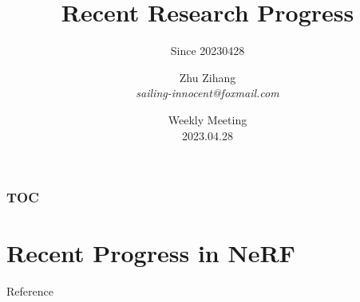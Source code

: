 \documentclass[10pt, hyperref={colorlinks=true,linkcolor=blue},xcolor=dvipsnames]{beamer}
\title[title]{ Recent Research Progress }
\subtitle{Since 20230428}
\author[Zhu Zihang]{\texorpdfstring{Zhu Zihang \\ \smallskip \textit{sailing-innocent@foxmail.com}}{}}
\date[\today]{\texorpdfstring{Weekly Meeting \\ 2023.04.28}{}}
\begin{document}
\begin{frame}
    \titlepage
\end{frame}

\begin{frame}
    \frametitle{TOC}
    \tableofcontents
\end{frame}

\section{Recent Progress in NeRF}

\begin{frame}[allowframebreaks]{Reference}
    
    
\end{frame}
\end{document}
